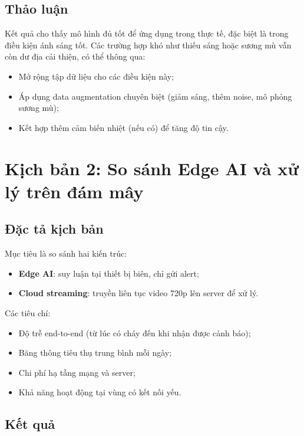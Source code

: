 \documentclass[12pt,a4paper]{report}
\begin{document}
\subsection{Thảo luận}

Kết quả cho thấy mô hình đủ tốt để ứng dụng trong thực tế, đặc biệt là trong điều kiện ánh sáng tốt. Các trường hợp khó như thiếu sáng hoặc sương mù vẫn còn dư địa cải thiện, có thể thông qua:
\begin{itemize}
  \item Mở rộng tập dữ liệu cho các điều kiện này;
  \item Áp dụng data augmentation chuyên biệt (giảm sáng, thêm noise, mô phỏng sương mù);
  \item Kết hợp thêm cảm biến nhiệt (nếu có) để tăng độ tin cậy.
\end{itemize}

\section{Kịch bản 2: So sánh Edge AI và xử lý trên đám mây}

\subsection{Đặc tả kịch bản}

Mục tiêu là so sánh hai kiến trúc:
\begin{itemize}
  \item \textbf{Edge AI}: suy luận tại thiết bị biên, chỉ gửi alert;
  \item \textbf{Cloud streaming}: truyền liên tục video 720p lên server để xử lý.
\end{itemize}

Các tiêu chí:
\begin{itemize}
  \item Độ trễ end-to-end (từ lúc có cháy đến khi nhận được cảnh báo);
  \item Băng thông tiêu thụ trung bình mỗi ngày;
  \item Chi phí hạ tầng mạng và server;
  \item Khả năng hoạt động tại vùng có kết nối yếu.
\end{itemize}

\subsection{Kết quả}
\end{document}

